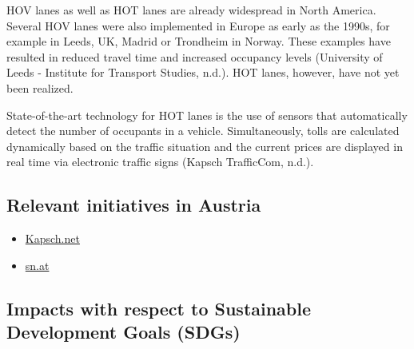 \documentclass[
]{book}
\providecommand{\tightlist}{%
  \setlength{\itemsep}{0pt}\setlength{\parskip}{0pt}}
\begin{document}
HOV lanes as well as HOT lanes are already widespread in North America. Several HOV lanes were also implemented in Europe as early as the 1990s, for example in Leeds, UK, Madrid or Trondheim in Norway. These examples have resulted in reduced travel time and increased occupancy levels (University of Leeds - Institute for Transport Studies, n.d.). HOT lanes, however, have not yet been realized.

State-of-the-art technology for HOT lanes is the use of sensors that automatically detect the number of occupants in a vehicle. Simultaneously, tolls are calculated dynamically based on the traffic situation and the current prices are displayed in real time via electronic traffic signs (Kapsch TrafficCom, n.d.).

\hypertarget{relevant-initiatives-in-austria-3}{%
\subsection*{Relevant initiatives in Austria}\label{relevant-initiatives-in-austria-3}}

\begin{itemize}
\tightlist
\item
  \href{https://www.kapsch.net/ktc/Portfolio/IMS/Congestion/Managed-lanes}{Kapsch.net}
\item
  \href{https://www.sn.at/wirtschaft/oesterreich/kapsch-trafficcom-stellt-sich-breiter-auf-81617200}{sn.at}
\end{itemize}

\hypertarget{impacts-with-respect-to-sustainable-development-goals-sdgs-3}{%
\subsection*{Impacts with respect to Sustainable Development Goals (SDGs)}\label{impacts-with-respect-to-sustainable-development-goals-sdgs-3}}
\end{document}
